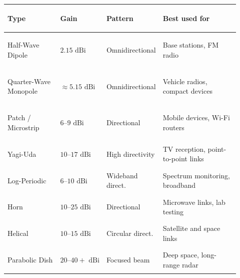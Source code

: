 
\begin{tcolorbox}[
  colback=black!2,
  colframe=blue!35!black,
  fonttitle=\large\bfseries\sffamily,
  toptitle=2mm,
  bottomtitle=2mm,
  boxrule=0.7pt,
  arc=0mm,
  left=4mm,
  right=4mm,
  top=3mm,
  bottom=3mm
]
\small
\setlength{\tabcolsep}{4pt}
\renewcommand{\arraystretch}{1.25}

\vspace{0.18em}

\begin{tabular}{@{}>{\bfseries\raggedright\arraybackslash}p{0.24\linewidth}>{\sffamily\raggedright\arraybackslash}p{0.14\linewidth}>{\raggedright\arraybackslash}p{0.18\linewidth}>{\raggedright\arraybackslash}p{0.36\linewidth}@{}}
  \toprule
  \textbf{Type} & \textbf{Gain} & \textbf{Pattern} & \textbf{Best used for} \\
  \midrule
  Half-Wave Dipole & $2.15\text{ dBi}$ & Omnidirectional & Base stations, FM radio \\

  Quarter-Wave Monopole & $\approx 5.15\text{ dBi}$ & Omnidirectional & Vehicle radios, compact devices \\

  Patch / Microstrip & $6\text{--}9\text{ dBi}$ & Directional & Mobile devices, Wi-Fi routers \\

  Yagi-Uda & $10\text{--}17\text{ dBi}$ & High directivity & TV reception, point-to-point links \\

  Log-Periodic & $6\text{--}10\text{ dBi}$ & Wideband direct. & Spectrum monitoring, broadband \\

  Horn & $10\text{--}25\text{ dBi}$ & Directional & Microwave links, lab testing \\

  Helical & $10\text{--}15\text{ dBi}$ & Circular direct. & Satellite and space links \\

  Parabolic Dish & $20\text{--}40+\text{ dBi}$ & Focused beam & Deep space, long-range radar \\
  \bottomrule
\end{tabular}


\end{tcolorbox}
